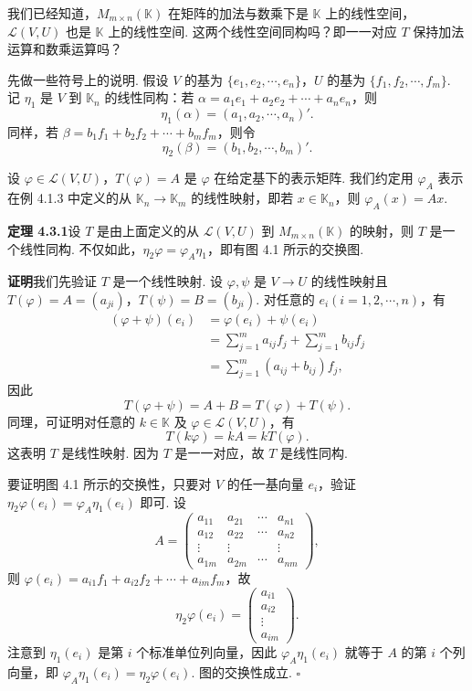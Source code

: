 \documentclass[UTF8, 12pt, fontset=fandol, oneside]{ctexart}
\begin{document}
我们已经知道，$M_{m\times n}(\mathbb{K})$ 在矩阵的加法与数乘下是 $\mathbb{K}$ 上的线性空间，$\mathcal{L}(V,U)$ 也是 $\mathbb{K}$ 上的线性空间. 这两个线性空间同构吗？即一一对应 $T$ 保持加法运算和数乘运算吗？

先做一些符号上的说明. 假设 $V$ 的基为 $\{e_1,e_2,\cdots,e_n\}$，$U$ 的基为 $\{f_1,f_2,\cdots,f_m\}$. 记 $\eta_1$ 是 $V$ 到 $\mathbb{K}_n$ 的线性同构：若 $\alpha=a_1e_1+a_2e_2+\cdots+a_ne_n$，则
\[
\eta_1(\alpha)=(a_1,a_2,\cdots,a_n)'.
\]
同样，若 $\beta=b_1f_1+b_2f_2+\cdots+b_mf_m$，则令
\[
\eta_2(\beta)=(b_1,b_2,\cdots,b_m)'.
\]

设 $\varphi\in\mathcal{L}(V,U)$，$T(\varphi)=A$ 是 $\varphi$ 在给定基下的表示矩阵. 我们约定用 $\varphi_A$ 表示在例 4.1.3 中定义的从 $\mathbb{K}_n\to\mathbb{K}_m$ 的线性映射，即若 $x\in\mathbb{K}_n$，则 $\varphi_A(x)=Ax$.

\noindent\textbf{定理 4.3.1}\quad 设 $T$ 是由上面定义的从 $\mathcal{L}(V,U)$ 到 $M_{m\times n}(\mathbb{K})$ 的映射，则 $T$ 是一个线性同构. 不仅如此，$\eta_2\varphi=\varphi_A\eta_1$，即有图 4.1 所示的交换图.

\noindent\textbf{证明}\quad 我们先验证 $T$ 是一个线性映射. 设 $\varphi,\psi$ 是 $V\to U$ 的线性映射且 $T(\varphi)=A=(a_{ji})$，$T(\psi)=B=(b_{ji})$. 对任意的 $e_i(i=1,2,\cdots,n)$，有
\[
\begin{aligned}
(\varphi+\psi)(e_i)
&=\varphi(e_i)+\psi(e_i)\\
&=\sum_{j=1}^m a_{ij}f_j+\sum_{j=1}^m b_{ij}f_j\\
&=\sum_{j=1}^m(a_{ij}+b_{ij})f_j,
\end{aligned}
\]
因此
\[
T(\varphi+\psi)=A+B=T(\varphi)+T(\psi).
\]
同理，可证明对任意的 $k\in\mathbb{K}$ 及 $\varphi\in\mathcal{L}(V,U)$，有
\[
T(k\varphi)=kA=kT(\varphi).
\]
这表明 $T$ 是线性映射. 因为 $T$ 是一一对应，故 $T$ 是线性同构.

要证明图 4.1 所示的交换性，只要对 $V$ 的任一基向量 $e_i$，验证 $\eta_2\varphi(e_i)=\varphi_A\eta_1(e_i)$ 即可. 设
\[
A=
\left(\begin{array}{cccc}
a_{11} & a_{21} & \cdots & a_{n1}\\
a_{12} & a_{22} & \cdots & a_{n2}\\
\vdots & \vdots & & \vdots\\
a_{1m} & a_{2m} & \cdots & a_{nm}
\end{array}\right),
\]
则 $\varphi(e_i)=a_{i1}f_1+a_{i2}f_2+\cdots+a_{im}f_m$，故
\[
\eta_2\varphi(e_i)=
\left(\begin{array}{c}
a_{i1}\\
a_{i2}\\
\vdots\\
a_{im}
\end{array}\right).
\]
注意到 $\eta_1(e_i)$ 是第 $i$ 个标准单位列向量，因此 $\varphi_A\eta_1(e_i)$ 就等于 $A$ 的第 $i$ 个列向量，即 $\varphi_A\eta_1(e_i)=\eta_2\varphi(e_i)$. 图的交换性成立. $\square$
\end{document}

